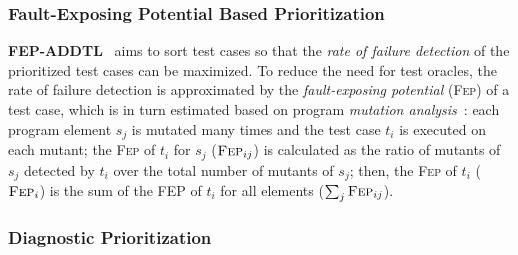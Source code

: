 \subsubsection{Fault-Exposing Potential Based Prioritization}
\textbf{\textsc{F{\scriptsize EP}-A{\scriptsize DDTL}}}~\citep{RUCH01} aims to sort test cases so that the {\em rate of failure detection}
of the prioritized test cases can be maximized. To reduce the need for test oracles, the rate of failure detection is approximated by the
{\em fault-exposing potential} (\textsc{Fep}) of a test case, which is in turn estimated based on program {\em mutation analysis}~\citep{RGHamlet1977}:
each program element $s_j$ is mutated many times and
the test case $t_i$ is executed on each mutant; the \textsc{Fep} of $t_i$ for $s_j$ ($\textsc{Fep}_{ij}$) is calculated as
the ratio of mutants of $s_j$ detected by $t_i$ over the total number of
mutants of $s_j$; then, the \textsc{Fep} of $t_i$ ($\textsc{Fep}_i$) is the sum of the FEP of $t_i$ for all elements ($\sum_{j}\textsc{Fep}_{ij}$).

\subsubsection{Diagnostic Prioritization}\label{subsubsec.dp}
\begin{comment}
There are many techniques proposed to automatically generate a large number of test inputs. However, there are only a few methods that could automatically generate test oracles which are often limited to a certain family of failures, e.g.,~\citep{Artzi2010,Xie06}. In post-mortem study, test oracles can be obtained by running test cases on the correct program (see Figure~\ref{fig:problem}(A)). In practice, however, the code base contains faults and developers are not aware of its location unless testing and debugging are performed. Therefore, the fault-free version of the program is absent and testers have to manually create test oracles for each input, or check the correctness of program output one by one, both of which are laborious (see Figure~\ref{fig:problem}(B)).

Diagnostic prioritization is proposed to deal with this problem. Diagnostic prioritization select and prioritize a relatively smaller subset of test cases and ask users to label the test outcome. The goal of test case prioritization and diagnostic prioritization is different though; while test case prioritization is often employed to reduce the amount of time needed to run all tests, diagnostic prioritization would like to reduce the number of test cases that need manual labeling and yet optimize fault localization accuracy. The problem of running too many test cases is not important in diagnostic prioritization as the key issue to be solved is the lack of test cases (with available oracles). We define this problem in Definition~\ref{defn:diagnosticpriori}.

\subsubsection{Existing Methods}
\end{comment}

